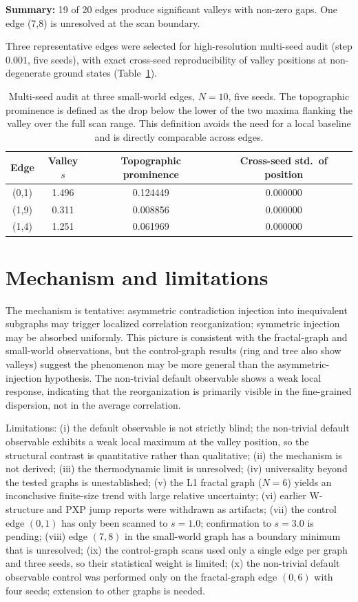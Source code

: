 \documentclass[aps,prb,reprint,superscriptaddress]{revtex4-2}
\begin{document}
\textbf{Summary:} 19 of 20 edges produce significant valleys with non-zero gaps. One edge (7,8) is unresolved at the scan boundary.

Three representative edges were selected for high-resolution multi-seed audit (step $0.001$, five seeds), with exact cross-seed reproducibility of valley positions at non-degenerate ground states (Table~\ref{tab:sw_multiseed}).

\begin{table}[h]
\centering
\caption{Multi-seed audit at three small-world edges, $N=10$, five seeds. The topographic prominence is defined as the drop below the lower of the two maxima flanking the valley over the full scan range. This definition avoids the need for a local baseline and is directly comparable across edges.}
\label{tab:sw_multiseed}
\begin{tabular}{cccc}
\toprule
Edge & Valley $s$ & Topographic prominence & Cross-seed std.\ of position \\
\midrule
(0,1) & 1.496 & 0.124449 & 0.000000 \\
(1,9) & 0.311 & 0.008856 & 0.000000 \\
(1,4) & 1.251 & 0.061969 & 0.000000 \\
\bottomrule
\end{tabular}
\end{table}

\section{Mechanism and limitations}

The mechanism is tentative: asymmetric contradiction injection into inequivalent subgraphs may trigger localized correlation reorganization; symmetric injection may be absorbed uniformly. This picture is consistent with the fractal-graph and small-world observations, but the control-graph results (ring and tree also show valleys) suggest the phenomenon may be more general than the asymmetric-injection hypothesis. The non-trivial default observable shows a weak local response, indicating that the reorganization is primarily visible in the fine-grained dispersion, not in the average correlation.

Limitations: (i) the default observable is not strictly blind; the non-trivial default observable exhibits a weak local maximum at the valley position, so the structural contrast is quantitative rather than qualitative; (ii) the mechanism is not derived; (iii) the thermodynamic limit is unresolved; (iv) universality beyond the tested graphs is unestablished; (v) the L1 fractal graph ($N=6$) yields an inconclusive finite-size trend with large relative uncertainty; (vi) earlier W-structure and PXP jump reports were withdrawn as artifacts; (vii) the control edge $(0,1)$ has only been scanned to $s=1.0$; confirmation to $s=3.0$ is pending; (viii) edge $(7,8)$ in the small-world graph has a boundary minimum that is unresolved; (ix) the control-graph scans used only a single edge per graph and three seeds, so their statistical weight is limited; (x) the non-trivial default observable control was performed only on the fractal-graph edge $(0,6)$ with four seeds; extension to other graphs is needed.
\end{document}
